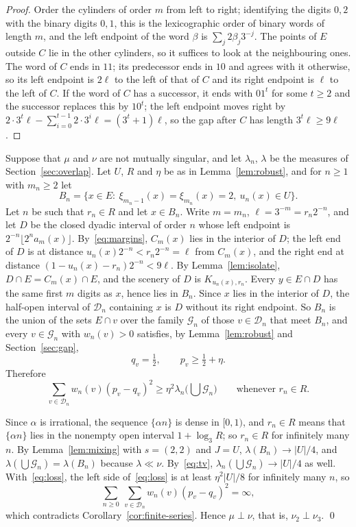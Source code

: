 \documentclass[11pt]{amsart}
\theoremstyle{remark}
\newcommand{\cD}{\mathcal D}
\begin{document}
\begin{proof}
Order the cylinders of order $m$ from left to right; identifying the digits $0,2$ with the binary digits $0,1$, this is the lexicographic order of binary words of length $m$, and the left endpoint of the word $\beta$ is $\sum_j2\beta_j3^{-j}$. The points of $E$ outside $C$ lie in the other cylinders, so it suffices to look at the neighbouring ones. The word of $C$ ends in $11$; its predecessor ends in $10$ and agrees with it otherwise, so its left endpoint is $2\ell$ to the left of that of $C$ and its right endpoint is $\ell$ to the left of $C$. If the word of $C$ has a successor, it ends with $01^t$ for some $t\ge2$ and the successor replaces this by $10^t$; the left endpoint moves right by $2\cdot3^t\ell-\sum_{i=0}^{t-1}2\cdot3^i\ell=(3^t+1)\ell$, so the gap after $C$ has length $3^t\ell\ge9\ell$.
\end{proof}

Suppose that $\mu$ and $\nu$ are not mutually singular, and let $\lambda_n$, $\lambda$ be the measures of Section~\ref{sec:overlap}. Let $U$, $R$ and $\eta$ be as in Lemma~\ref{lem:robust}, and for $n\ge1$ with $m_n\ge2$ let
\[
B_n=\{x\in E:\ \xi_{m_n-1}(x)=\xi_{m_n}(x)=2,\ u_n(x)\in U\}.
\]
Let $n$ be such that $r_n\in R$ and let $x\in B_n$. Write $m=m_n$, $\ell=3^{-m}=r_n2^{-n}$, and let $D$ be the closed dyadic interval of order $n$ whose left endpoint is $2^{-n}\lfloor2^na_m(x)\rfloor$. By~\eqref{eq:margins}, $C_m(x)$ lies in the interior of $D$; the left end of $D$ is at distance $u_n(x)2^{-n}<r_n2^{-n}=\ell$ from $C_m(x)$, and the right end at distance $(1-u_n(x)-r_n)2^{-n}<9\ell$. By Lemma~\ref{lem:isolate}, $D\cap E=C_m(x)\cap E$, and the scenery of $D$ is $K_{u_n(x),r_n}$. Every $y\in E\cap D$ has the same first $m$ digits as $x$, hence lies in $B_n$. Since $x$ lies in the interior of $D$, the half-open interval of $\cD_n$ containing $x$ is $D$ without its right endpoint. So $B_n$ is the union of the sets $E\cap v$ over the family $\mathcal G_n$ of those $v\in\cD_n$ that meet $B_n$, and every $v\in\mathcal G_n$ with $w_n(v)>0$ satisfies, by Lemma~\ref{lem:robust} and Section~\ref{sec:gap},
\[
q_v=\tfrac12,\qquad p_v\ge\tfrac12+\eta.
\]
Therefore
\begin{equation}\label{eq:loss}
\sum_{v\in\cD_n}w_n(v)(p_v-q_v)^2\ge\eta^2\lambda_n\Big(\bigcup\mathcal G_n\Big)\qquad\text{whenever }r_n\in R.
\end{equation}

Since $\alpha$ is irrational, the sequence $\{\alpha n\}$ is dense in $[0,1)$, and $r_n\in R$ means that $\{\alpha n\}$ lies in the nonempty open interval $1+\log_3R$; so $r_n\in R$ for infinitely many $n$. By Lemma~\ref{lem:mixing} with $s=(2,2)$ and $J=U$, $\lambda(B_n)\to|U|/4$, and $\lambda(\bigcup\mathcal G_n)=\lambda(B_n)$ because $\lambda\ll\nu$. By~\eqref{eq:tv}, $\lambda_n(\bigcup\mathcal G_n)\to|U|/4$ as well. With~\eqref{eq:loss}, the left side of~\eqref{eq:loss} is at least $\eta^2|U|/8$ for infinitely many $n$, so
\[
\sum_{n\ge0}\ \sum_{v\in\cD_n}w_n(v)(p_v-q_v)^2=\infty,
\]
which contradicts Corollary~\ref{cor:finite-series}. Hence $\mu\perp\nu$, that is, $\nu_2\perp\nu_3$. \qed
\end{document}
